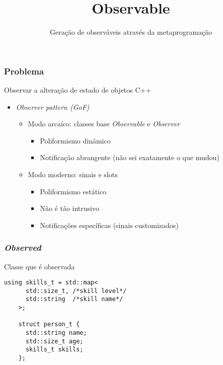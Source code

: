 \documentclass[t]{beamer}
\title{Observable}
\subtitle{Geração de observáveis através da metaprogramação}
\date{}
\begin{document}

\begin{frame}
  \titlepage
\end{frame}

\begin{frame}[fragile]
  \frametitle{Problema}
  Observar a alteração de estado de objetos C++

  \begin{itemize}
  \item<1->{\textit{Observer pattern (GoF)}}
    \begin{itemize}
    \item<2->{Modo arcaíco: classes base \textit{Observable} e \textit{Observer}}
      \begin{itemize}
      \item<3->{Poliformismo dinâmico} 
      \item<4->{Notificação abrangente (não sei exatamente o que mudou)} 
      \end{itemize}
    \item<5->{Modo moderno: sinais e slots}
      \begin{itemize}
      \item<6->{Poliformismo estático} 
      \item<7->{Não é tão intrusivo} 
      \item<8->{Notificações específicas (sinais customizados)} 
      \end{itemize}
    \end{itemize}
  \end{itemize}
\end{frame}

\begin{frame}[fragile]
  \frametitle{\textit{Observed}}
  Classe que é observada

  \begin{lstlisting}[escapeinside=`']
    using skills_t = std::map<
      std::size_t, /*skill level*/
      std::string  /*skill name*/
    >;

    struct person_t {
      std::string name;
      std::size_t age;
      skills_t skills;
    };
  \end{lstlisting}
\end{frame}
\end{document}
